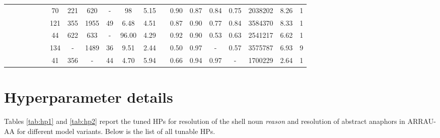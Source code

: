 \documentclass[11pt,letterpaper]{article}
\newcommand{\cmark}{\ding{51}}\newcommand{\xmark}{\ding{55}}
\begin{document}
\begin{table*}[t]
{\begin{tabular}{c|c|c|c|c|c|cccccccccccccc}
{\color{darkgreen} \cmark} & {\color{darkgreen} \cmark} & {\color{darkred} \xmark} & {\color{darkred} \xmark} & {\color{darkgreen} \cmark} & {\color{darkgreen} \cmark} & 70  & 221 & 620  & -   & 98    & 5.15 &              & 0.90 & 0.87 & 0.84 & 0.75 & 2038202 & 8.26 & 1   \\

{\color{darkgreen} \cmark} & {\color{darkgreen} \cmark} & {\color{darkgreen} \cmark} & {\color{darkred} \xmark} & {\color{darkgreen} \cmark} & {\color{darkgreen} \cmark} &121 & 355 & 1955 & 49 & 6.48 & 4.51 &  & 0.87 & 0.90 & 0.77 & 0.84 & 3584370 & 8.33 & 1\\
{\color{darkred} \xmark} & {\color{darkred} \xmark} & {\color{darkred} \xmark} & {\color{darkred} \xmark} & {\color{darkgreen} \cmark} & {\color{darkgreen} \cmark} &  44  & 622 & 633  & -   & 96.00 & 4.29 &         & 0.92 & 0.90 & 0.53 & 0.63 & 2541217 & 6.62 & 1 \\

{\color{darkgreen} \cmark} & {\color{darkgreen} \cmark} & {\color{darkgreen} \cmark} & {\color{darkgreen} \cmark} & {\color{darkred} \xmark} & {\color{darkgreen} \cmark} & 134 & -   & 1489 & 36  & 9.51  & 2.44 &        & 0.50 & 0.97 & -    & 0.57 & 3575787 & 6.93 & 9    \\
{\color{darkgreen} \cmark} & {\color{darkgreen} \cmark} & {\color{darkgreen} \cmark} & {\color{darkgreen} \cmark} & {\color{darkgreen} \cmark} & {\color{darkred} \xmark} &  41  & 356 & -    & 44  & 4.70  & 5.94 &         & 0.66 & 0.94 & 0.97 & -    & 1700229 & 2.64 & 1  \\
\bottomrule
\end{tabular}
}
\caption{HPs used for evaluation on the ARRAU-AA test set.}
\label{tab:hp2}
\end{table*} 
\section{Hyperparameter details}

Tables \ref{tab:hp1} and \ref{tab:hp2} report the tuned HPs for resolution of the shell noun \textit{reason} and resolution of abstract anaphors in ARRAU-AA for different model variants. Below is the list of all tunable HPs.
\end{document}

